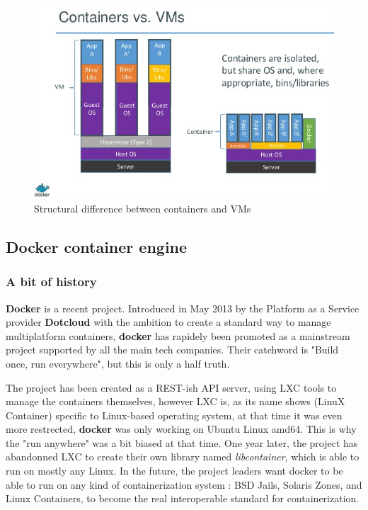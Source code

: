 \begin{figure}
	\includegraphics[width=\textwidth]{./Images/containers_vs_vms.png}
	\caption{Structural difference between containers and VMs}
\end{figure}

\subsection{Docker container engine}

\subsubsection{A bit of history}

\textbf{Docker} is a recent project. Introduced in May 2013 by the Platform as
a Service provider \textbf{Dotcloud} with the ambition to create a standard way
to manage multiplatform containers, \textbf{docker} has rapidely been promoted
as a mainstream project supported by all the main tech companies.  Their
catchword is "Build once, run everywhere", but this is only a half truth.

The project has been created as a REST-ish API server, using LXC tools to
manage the containers themselves, however LXC is, as its name shows (LinuX
Container) specific to Linux-based operating system, at that time it was even
more restrected, \textbf{docker} was only working on Ubuntu Linux amd64. This
is why the "run anywhere" was a bit biased at that time. One year later, the
project has abandonned LXC to create their own library named
\textit{libcontainer}, which is able to run on mostly any Linux. In the future,
the project leaders want docker to be able to run on any kind of
containerization system : BSD Jails, Solaris Zones, and Linux Containers, to
become the real interoperable standard for containerization.

